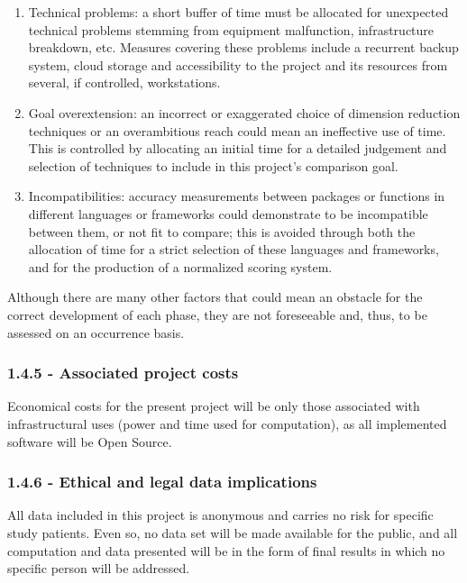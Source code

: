 \documentclass[]{article}
\begin{document}
\begin{enumerate}
\def\labelenumi{\arabic{enumi}.}
\item
  Technical problems: a short buffer of time must be allocated for
  unexpected technical problems stemming from equipment malfunction,
  infrastructure breakdown, etc. Measures covering these problems
  include a recurrent backup system, cloud storage and accessibility to
  the project and its resources from several, if controlled,
  workstations.
\item
  Goal overextension: an incorrect or exaggerated choice of dimension
  reduction techniques or an overambitious reach could mean an
  ineffective use of time. This is controlled by allocating an initial
  time for a detailed judgement and selection of techniques to include
  in this project's comparison goal.
\item
  Incompatibilities: accuracy measurements between packages or functions
  in different languages or frameworks could demonstrate to be
  incompatible between them, or not fit to compare; this is avoided
  through both the allocation of time for a strict selection of these
  languages and frameworks, and for the production of a normalized
  scoring system.
\end{enumerate}

Although there are many other factors that could mean an obstacle for
the correct development of each phase, they are not foreseeable and,
thus, to be assessed on an occurrence basis.

\subsubsection{1.4.5 - Associated project
costs}\label{associated-project-costs}

Economical costs for the present project will be only those associated
with infrastructural uses (power and time used for computation), as all
implemented software will be Open Source.

\subsubsection{1.4.6 - Ethical and legal data
implications}\label{ethical-and-legal-data-implications}

All data included in this project is anonymous and carries no risk for
specific study patients. Even so, no data set will be made available for
the public, and all computation and data presented will be in the form
of final results in which no specific person will be addressed.
\end{document}
